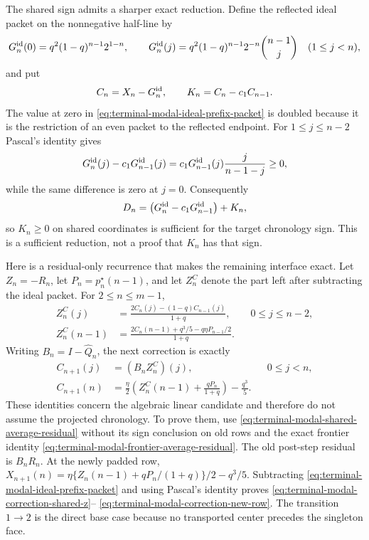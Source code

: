 The shared sign admits a sharper exact reduction.  Define the reflected ideal
packet on the nonnegative half-line by
\begin{equation}
 G_n^{\rm id}(0)=q^2(1-q)^{n-1}2^{1-n},\qquad
 G_n^{\rm id}(j)=q^2(1-q)^{n-1}2^{-n}\binom{n-1}{j}
 \quad(1\le j<n),
 \label{eq:terminal-modal-ideal-prefix-packet}
\end{equation}
and put
\begin{equation}
 C_n=X_n-G_n^{\rm id},\qquad
 K_n=C_n-c_1C_{n-1}.
 \label{eq:terminal-modal-prefix-correction}
\end{equation}
The value at zero in \eqref{eq:terminal-modal-ideal-prefix-packet} is doubled
because it is the restriction of an even packet to the reflected endpoint.
For $1\le j\le n-2$ Pascal's identity gives
\begin{equation}
 G_n^{\rm id}(j)-c_1G_{n-1}^{\rm id}(j)
 =c_1G_{n-1}^{\rm id}(j)\frac{j}{n-1-j}\ge0,
 \label{eq:terminal-modal-ideal-prefix-sign}
\end{equation}
while the same difference is zero at $j=0$.  Consequently
\begin{equation}
 D_n=\bigl(G_n^{\rm id}-c_1G_{n-1}^{\rm id}\bigr)+K_n,
 \label{eq:terminal-modal-prefix-sign-split}
\end{equation}
so $K_n\ge0$ on shared coordinates is sufficient for the target chronology
sign.  This is a sufficient reduction, not a proof that $K_n$ has that sign.

Here is a residual-only recurrence that makes the remaining interface exact.
Let $Z_n=-R_n$, let $P_n=p_n^\star(n-1)$, and let
$Z_n^C$ denote the part left after subtracting the ideal packet.  For
$2\le n\le m-1$,
\begin{align}
 Z_n^C(j)&=\frac{2C_n(j)-(1-q)C_{n-1}(j)}{1+q},
 &&0\le j\le n-2,
 \label{eq:terminal-modal-correction-shared-z}\\
 Z_n^C(n-1)&=\frac{2C_n(n-1)+q^3/5-q\eta P_{n-1}/2}{1+q}.
 \label{eq:terminal-modal-correction-frontier-z}
\end{align}
Writing $B_n=I-\widehat Q_n$, the next correction is exactly
\begin{align}
 C_{n+1}(j)&=(B_nZ_n^C)(j),&&0\le j<n,
 \label{eq:terminal-modal-correction-old-rows}\\
 C_{n+1}(n)&=\frac\eta2
 \left(Z_n^C(n-1)+\frac{qP_n}{1+q}\right)-\frac{q^3}{5}.
 \label{eq:terminal-modal-correction-new-row}
\end{align}
These identities concern the algebraic linear candidate and therefore do not
assume the projected chronology.  To prove them, use
\eqref{eq:terminal-modal-shared-average-residual} without its sign conclusion
on old rows and the exact frontier identity
\eqref{eq:terminal-modal-frontier-average-residual}.  The old post-step
residual is $B_nR_n$.  At the newly padded row,
$X_{n+1}(n)=\eta\{Z_n(n-1)+qP_n/(1+q)\}/2-q^3/5$.
Subtracting \eqref{eq:terminal-modal-ideal-prefix-packet} and using Pascal's
identity proves \eqref{eq:terminal-modal-correction-shared-z}--
\eqref{eq:terminal-modal-correction-new-row}.  The transition $1\to2$ is the
direct base case because no transported center precedes the singleton face.

